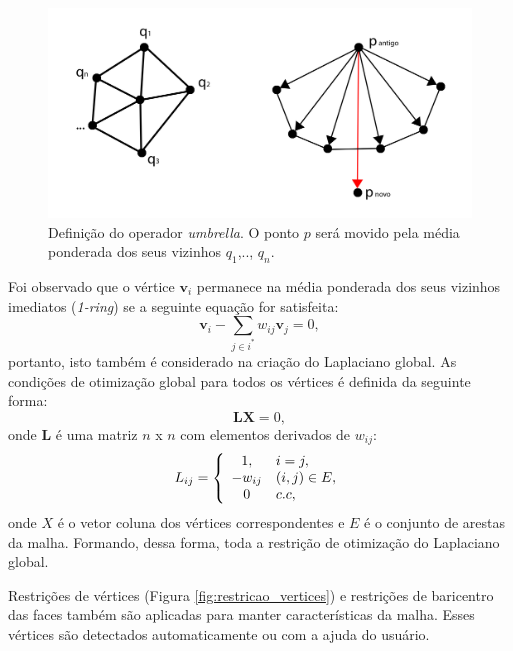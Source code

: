 \begin{figure}[!h]
\captionsetup{width=\linewidth}
\centering
\includegraphics[scale=0.30]{figuras/umbrella_operator.png}
\caption{Definição do operador \textit{umbrella}. O ponto $p$ será movido pela média ponderada dos seus vizinhos $q_1$,.., $q_n$.}
\label{fig:umbrella}
\end{figure}

Foi observado que o vértice $\mathbf{v}_i$ permanece na média ponderada dos seus vizinhos imediatos (\textit{1-ring}) se a seguinte equação for satisfeita:
\begin{equation}
    \mathbf{v}_i - \sum_{j\in i^*}{w_{ij}\mathbf{v}_j} = 0,
\end{equation}
portanto, isto também é considerado na criação do Laplaciano global. As condições de otimização global para todos os vértices é definida da seguinte forma:
\begin{equation}
    \mathbf{L}\mathbf{X} = 0,
\end{equation}
onde $\mathbf{L}$ é uma matriz $n$ x $n$ com elementos derivados de $w_{ij}$:
\begin{equation}
L_{ij}=\left\{
\begin{array}{c l}	
     1, & i=j,\\
     -w_{ij} & (i,j) \in E, \\
     0 & c.c,
\end{array}\right.
\end{equation}
onde $X$ é o vetor coluna dos vértices correspondentes e $E$ é o conjunto de arestas da malha. Formando, dessa forma, toda a restrição de otimização do Laplaciano global.

Restrições de vértices (Figura \ref{fig:restricao_vertices}) e restrições de baricentro das faces também são aplicadas para manter características da malha. Esses vértices são detectados automaticamente ou com a ajuda do usuário.

